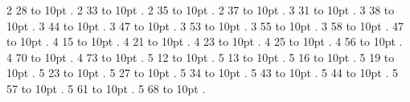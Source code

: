 \smallskip
{} 2 28 \leaders\hbox to 10pt {\hss.\hss}  \hfill {}
\smallskip
{} 2 33 \leaders\hbox to 10pt {\hss.\hss}  \hfill {}
\smallskip
{} 2 35 \leaders\hbox to 10pt {\hss.\hss}  \hfill {}
\smallskip
{} 2 37 \leaders\hbox to 10pt {\hss.\hss}  \hfill {}
\smallskip
{} 3 31 \leaders\hbox to 10pt {\hss.\hss}  \hfill {}
\smallskip
{} 3 38 \leaders\hbox to 10pt {\hss.\hss}  \hfill {}
\smallskip
{} 3 44 \leaders\hbox to 10pt {\hss.\hss}  \hfill {}
\smallskip
{} 3 47 \leaders\hbox to 10pt {\hss.\hss}  \hfill {}
\smallskip
{} 3 53 \leaders\hbox to 10pt {\hss.\hss}  \hfill {}
\smallskip
{} 3 55 \leaders\hbox to 10pt {\hss.\hss}  \hfill {}
\smallskip
{} 3 58 \leaders\hbox to 10pt {\hss.\hss}  \hfill {}
\smallskip
{} 47 \leaders\hbox to 10pt {\hss.\hss}  \hfill {}
\smallskip
{} 4 15 \leaders\hbox to 10pt {\hss.\hss}  \hfill {}
\smallskip
{} 4 21 \leaders\hbox to 10pt {\hss.\hss}  \hfill {}
\smallskip
{} 4 23 \leaders\hbox to 10pt {\hss.\hss}  \hfill {}
\smallskip
{} 4 25 \leaders\hbox to 10pt {\hss.\hss}  \hfill {}
\smallskip
{} 4 56 \leaders\hbox to 10pt {\hss.\hss}  \hfill {}
\smallskip
{} 4 70 \leaders\hbox to 10pt {\hss.\hss}  \hfill {}
\smallskip
{} 4 73 \leaders\hbox to 10pt {\hss.\hss}  \hfill {}
\smallskip
{} 5 12 \leaders\hbox to 10pt {\hss.\hss}  \hfill {}
\smallskip
{} 5 13 \leaders\hbox to 10pt {\hss.\hss}  \hfill {}
\smallskip
{} 5 16 \leaders\hbox to 10pt {\hss.\hss}  \hfill {}
\smallskip
{} 5 19 \leaders\hbox to 10pt {\hss.\hss}  \hfill {}
\smallskip
{} 5 23 \leaders\hbox to 10pt {\hss.\hss}  \hfill {}
\smallskip
{} 5 27 \leaders\hbox to 10pt {\hss.\hss}  \hfill {}
\smallskip
{} 5 34 \leaders\hbox to 10pt {\hss.\hss}  \hfill {}
\smallskip
{} 5 43 \leaders\hbox to 10pt {\hss.\hss}  \hfill {}
\smallskip
{} 5 44 \leaders\hbox to 10pt {\hss.\hss}  \hfill {}
\smallskip
{} 5 57 \leaders\hbox to 10pt {\hss.\hss}  \hfill {}
\smallskip
{} 5 61 \leaders\hbox to 10pt {\hss.\hss}  \hfill {}
\smallskip
{} 5 68 \leaders\hbox to 10pt {\hss.\hss}  \hfill {}
